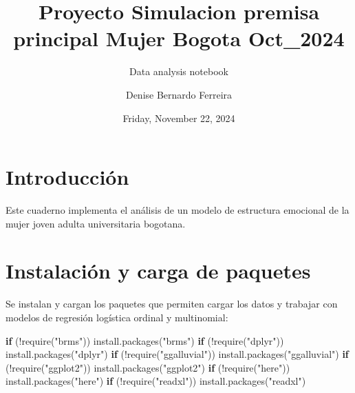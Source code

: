 \documentclass[
  letterpaper,
  DIV=11,
  numbers=noendperiod]{scrartcl}
\title{Proyecto Simulacion premisa principal Mujer Bogota Oct\_2024}
\subtitle{Data analysis notebook}
\author{Denise Bernardo Ferreira}
\date{Friday, November 22, 2024}
\newenvironment{Shaded}{\begin{snugshade}}{\end{snugshade}}
\newcommand{\ControlFlowTok}[1]{\textcolor[rgb]{0.00,0.23,0.31}{\textbf{#1}}}
\newcommand{\FunctionTok}[1]{\textcolor[rgb]{0.28,0.35,0.67}{#1}}
\newcommand{\NormalTok}[1]{\textcolor[rgb]{0.00,0.23,0.31}{#1}}
\newcommand{\SpecialCharTok}[1]{\textcolor[rgb]{0.37,0.37,0.37}{#1}}
\newcommand{\StringTok}[1]{\textcolor[rgb]{0.13,0.47,0.30}{#1}}
\renewcommand*\contentsname{Table of contents}
\newcommand\contentsname{Table of contents}
\begin{document}
\maketitle

\renewcommand*\contentsname{Table of contents}
{
\hypersetup{linkcolor=}
\setcounter{tocdepth}{3}
\tableofcontents
}

\section{Introducción}\label{introducciuxf3n}

Este cuaderno implementa el análisis de un modelo de estructura
emocional de la mujer joven adulta universitaria bogotana.

\section{Instalación y carga de
paquetes}\label{instalaciuxf3n-y-carga-de-paquetes}

Se instalan y cargan los paquetes que permiten cargar los datos y
trabajar con modelos de regresión logística ordinal y multinomial:

\begin{Shaded}
\begin{Highlighting}[]
\ControlFlowTok{if}\NormalTok{ (}\SpecialCharTok{!}\FunctionTok{require}\NormalTok{(}\StringTok{"brms"}\NormalTok{)) }\FunctionTok{install.packages}\NormalTok{(}\StringTok{"brms"}\NormalTok{)}
\ControlFlowTok{if}\NormalTok{ (}\SpecialCharTok{!}\FunctionTok{require}\NormalTok{(}\StringTok{"dplyr"}\NormalTok{)) }\FunctionTok{install.packages}\NormalTok{(}\StringTok{"dplyr"}\NormalTok{)}
\ControlFlowTok{if}\NormalTok{ (}\SpecialCharTok{!}\FunctionTok{require}\NormalTok{(}\StringTok{"ggalluvial"}\NormalTok{)) }\FunctionTok{install.packages}\NormalTok{(}\StringTok{"ggalluvial"}\NormalTok{)}
\ControlFlowTok{if}\NormalTok{ (}\SpecialCharTok{!}\FunctionTok{require}\NormalTok{(}\StringTok{"ggplot2"}\NormalTok{)) }\FunctionTok{install.packages}\NormalTok{(}\StringTok{"ggplot2"}\NormalTok{)}
\ControlFlowTok{if}\NormalTok{ (}\SpecialCharTok{!}\FunctionTok{require}\NormalTok{(}\StringTok{"here"}\NormalTok{)) }\FunctionTok{install.packages}\NormalTok{(}\StringTok{"here"}\NormalTok{)}
\ControlFlowTok{if}\NormalTok{ (}\SpecialCharTok{!}\FunctionTok{require}\NormalTok{(}\StringTok{"readxl"}\NormalTok{)) }\FunctionTok{install.packages}\NormalTok{(}\StringTok{"readxl"}\NormalTok{)}
\end{Highlighting}
\end{Shaded}
\end{document}
